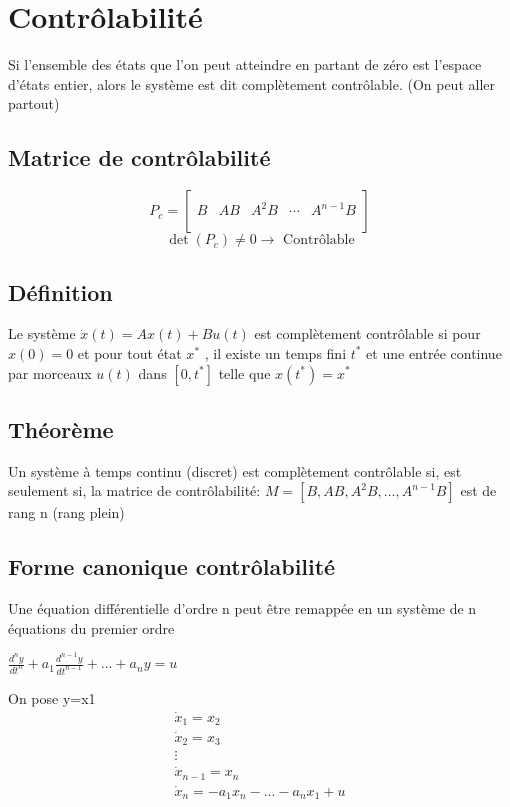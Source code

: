 \documentclass[resume]{subfiles}
\begin{document}
\section{Contrôlabilité}

Si l'ensemble des états que l'on peut atteindre en partant de zéro est l'espace d'états entier, alors le système est dit complètement contrôlable. (On peut aller partout)
\subsection{Matrice de contrôlabilité}
$$P_c=\begin{bmatrix}
\\
B & AB & A^2B & \cdots & A^{n-1}B\\
\\
\end{bmatrix}$$
$$\boxed{\det(P_c)\neq 0\longrightarrow\text{ Contrôlable}}$$





\subsection{Définition}

Le système $\dot{x}(t) = Ax(t)+Bu(t)$ est complètement contrôlable si pour $x(0)=0$ et pour tout état $x^*$ , il existe un temps fini $t^*$ et une entrée continue par morceaux $u(t)$ dans $[0,t^*]$ telle que $x(t^*)=x^*$ 

\subsection{Théorème}

Un système à temps continu (discret) est complètement contrôlable si, est seulement si, la matrice de contrôlabilité:
$M = [B, AB, A^2B,..., A^{n-1}B]$ est de rang n  (rang plein)

\subsection{Forme canonique contrôlabilité}

Une équation différentielle d'ordre n peut être remappée en un système de n équations du premier ordre

$\frac{d^ny}{dt^n} + a_1\frac{d^{n-1}y}{dt^{n-1}}+...+ a_ny=u$ 

On pose y=x1
\begin{align*}
\dot{x}_1 = x_2\\
\dot{x}_2 = x_3\\
\vdots\\
\dot{x}_{n-1} = x_n\\
\dot{x}_n = -a_1x_n -...- a_nx_1+u
\end{align*}
\end{document}
